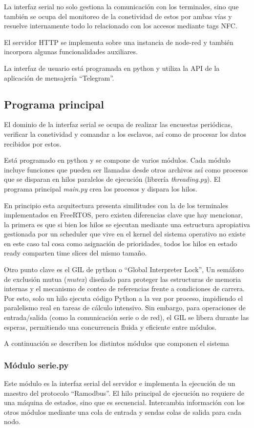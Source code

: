 La interfaz serial no solo gestiona la comunicación con los terminales, sino que también se ocupa del monitoreo de la conetividad de estos por ambas vías y resuelve internamente todo lo relacionado con los accesos mediante tags NFC.

El servidor HTTP se implementa sobre una instancia de node-red y también incorpora algunas funcionalidades auxiliares.

La interfaz de usuario está programada en python y utiliza la API de la aplicación de mensajería \enquote{Telegram}.


\subsection{Programa principal}
El dominio de la interfaz serial se ocupa de realizar las encuestas periódicas, verificar la conetividad y comandar a los esclavos, así como de procesar los datos recibidos por estos.

Está programado en python y se compone de varios módulos. Cada módulo incluye funciones que pueden ser llamadas desde otros archivos así como procesos que se disparan en hilos paralelos de ejecución (librería \textit{threading.py}). El programa principal \textit{main.py} crea los procesos y dispara los hilos.

En principio esta arquitectura presenta similitudes con la de los terminales implementados en FreeRTOS, pero existen diferencias clave que hay mencionar, la primera es que si bien los hilos se ejecutan mediante una estructura apropiativa gestionada por un scheduler que vive en el kernel del sistema operativo no existe en este caso tal cosa como asignación de prioridades, todos los hilos en estado ready comparten time slices del mismo tamaño.

Otro punto clave es el GIL de python o \enquote{Global Interpreter Lock}, Un semáforo de exclusión mutua (\textit{mutex}) diseñado para proteger las estructuras de memoria internas y el mecanismo de conteo de referencias frente a condiciones de carrera. Por esto, solo un hilo ejecuta código Python a la vez por proceso, impidiendo el paralelismo real en tareas de cálculo intensivo. Sin embargo, para operaciones de entrada/salida (como la comunicación serie o de red), el GIL se libera durante las esperas, permitiendo una concurrencia fluida y eficiente entre módulos.


A continuación se describen los distintos módulos que componen el sistema

\subsubsection{Módulo serie.py}
Este módulo es la interfaz serial del servidor e implementa la ejecución de un maestro del protocolo \enquote{Ramodbus}. El hilo principal de ejecución no requiere de una máquina de estados, sino que es secuencial. Intercambia información con los otros módulos mediante una cola de entrada y sendas colas de salida para cada nodo.

